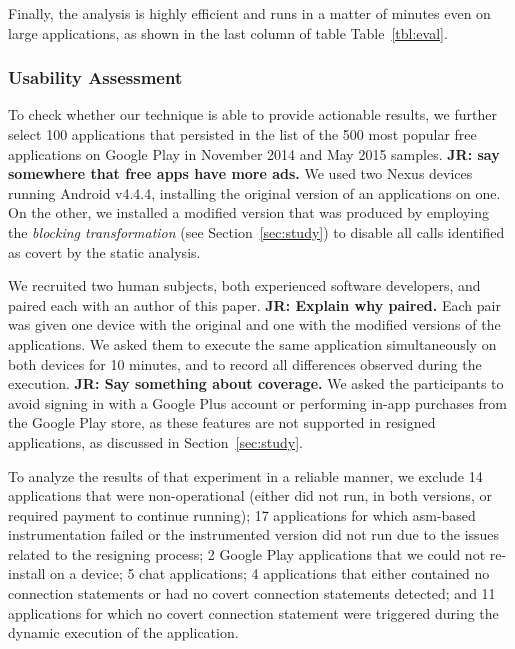 Finally, the analysis is highly efficient and
runs in a matter of minutes even on large applications, as shown in
the last column of table Table~\ref{tbl:eval}.



\subsubsection{Usability Assessment}
To check whether our technique is able to provide actionable results, we further select 100 applications that persisted in the list of the 500 most popular free applications on Google Play in November 2014 and May 2015 samples. 
{\bf JR: say somewhere that free apps have more ads.}
We used two Nexus devices running Android v4.4.4, installing the original version of an applications on one. On the other, we installed a modified version that was produced by employing the \emph{blocking transformation} (see Section~\ref{sec:study}) to disable all calls identified as covert by the static analysis. 

We recruited two human subjects, both experienced software developers, and paired each with an author of this paper.
{\bf JR: Explain why paired.}
Each pair was given one device with the original and one with the modified versions of the applications. We asked them to execute the same application simultaneously on both devices for 10 minutes, and to record all differences observed during the execution.
{\bf JR: Say something about coverage.}
We asked the participants to avoid signing in with a Google Plus account or performing in-app purchases from the Google Play store, as these features are not supported in resigned applications, as discussed in Section~\ref{sec:study}.

To analyze the results of that experiment in a reliable manner, we exclude 14 applications that were non-operational (either did not run, in both versions, or required payment to continue running);
 17 applications for which asm-based instrumentation failed or the instrumented version did not run due to the issues related to the resigning process;
 2 Google Play applications that we could not re-install on a device;
5 chat applications;
4 applications that either contained no connection statements or had no covert connection statements detected;
and 11 applications for which no covert connection statement were triggered during the dynamic execution of the application.

